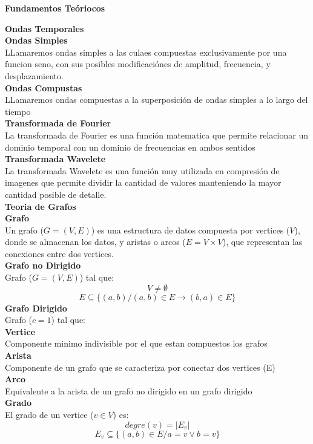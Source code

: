 \documentclass[12pt, letterpaper, twoside]{article}
\begin{document}
		{\bfseries\normalsize Fundamentos Teóriocos \par}
		{\textbf{Ondas Temporales}}\\
			{\textbf{Ondas Simples}}\\
			LLamaremos ondas simples a las culaes compuestas exclusivamente por una funcion seno, con sus posibles modificaciónes de amplitud, frecuencia, y desplazamiento.\\
			{\textbf{Ondas Compustas}}\\
			LLamaremos ondas compuestas a la superposición de ondas simples a lo largo del tiempo\\
			{\textbf{Transformada de Fourier}}\\
			La transformada de Fourier es una función matematica que permite relacionar un dominio temporal con un dominio de frecuencias en ambos sentidos\\
			{\textbf{Transformada Wavelete}}\\
			La transformada Wavelete es una función muy utilizada en compresión de imagenes que permite dividir la cantidad de valores manteniendo la mayor cantidad posible de detalle.\\
		{\textbf{Teoria de Grafos}}\\
			{\textbf{Grafo}}\\
			Un grafo  ($G = (V,E)$) es una estructura de datos compuesta por vertices ($V$), donde se almacenan los datos, y aristas o arcos ($E=V\times V$), que representan las conexiones entre dos vertices.\\
			{\textbf{Grafo no Dirigido}}\\
			Grafo  ($G = (V,E)$) tal que:
			\[ V \neq \emptyset \]
			\[ E\subseteq \{ (a,b) / (a,b)\in E \rightarrow (b,a)\in E  \}  \]
			{\textbf{Grafo Dirigido}}\\
			Grafo  ($c = 1$) tal que:\\
			{\textbf{Vertice}}\\
			Componente minimo indivisible por el que estan compuestos los grafos\\
			{\textbf{Arista}}\\
			Componente de un grafo que se caracteriza por conectar dos vertices (E)\\
			{\textbf{Arco}}\\
			Equivalente a la arista de un grafo no dirigido en un grafo dirigido\\
			{\textbf{Grado}}\\
			El grado de un vertice ($v\in V$) es:
			\[degre(v)=|E_v|\]
			\[ E_v\subseteq \{ (a,b)\in E / a=v \lor b=v \}  \]
\end{document}
